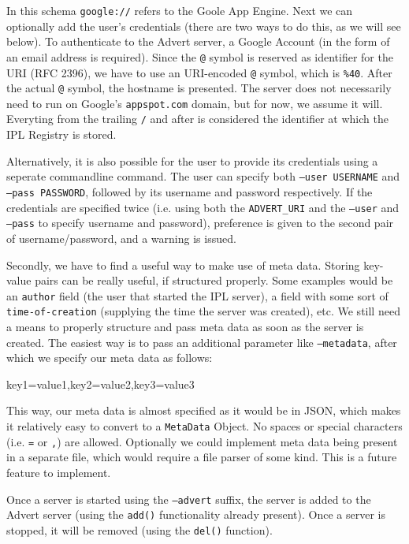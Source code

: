 In this schema \texttt{google://} refers to the Goole App Engine. Next we can
optionally add the user's credentials (there are two ways to do this, as we
will see below). To authenticate to the Advert server, a Google Account (in
the form of an email address is required). Since the \texttt{@} symbol is
reserved as identifier for the URI (RFC 2396), we have to use an URI-encoded
\texttt{@} symbol, which is \texttt{\%40}. After the actual \texttt{@}
symbol, the hostname is presented. The server does not necessarily need to run
on Google's \texttt{appspot.com} domain, but for now, we assume it will.
Everyting from the trailing \texttt{/} and after is considered the identifier at
which the IPL Registry is stored.

Alternatively, it is also possible for the user to provide its credentials
using a seperate commandline command. The user can specify both \texttt{--user
USERNAME} and \texttt{--pass PASSWORD}, followed by its username and password
respectively. If the credentials are specified twice (i.e. using both the
\texttt{ADVERT\_URI} and the \texttt{--user} and \texttt{--pass} to specify
username and password), preference is given to the second pair of
username/password, and a warning is issued.

Secondly, we have to find a useful way to make use of meta data. Storing
key-value pairs can be really useful, if structured properly. Some examples
would be an \texttt{author} field (the user that started the IPL server), a
field with some sort of \texttt{time-of-creation} (supplying the time the
server was created), etc. We still need a means to properly structure
and pass meta data as soon as the server is created. The easiest way is to pass
an additional parameter like \texttt{--metadata}, after which we specify our
meta data as follows:

\begin{center}
\begin{code}
key1=value1,key2=value2,key3=value3
\end{code}
\end{center}

This way, our meta data is almost specified as it would be in JSON, which makes
it relatively easy to convert to a \texttt{MetaData} Object. No spaces or
special characters (i.e. \texttt{=} or \texttt{,}) are allowed. Optionally we
could implement meta data being present in a separate file, which would require a
file parser of some kind. This is a future feature to implement.

Once a server is started using the \texttt{--advert} suffix, the server is added
to the Advert server (using the \texttt{add()} functionality already present).
Once a server is stopped, it will be removed (using the \texttt{del()}
function).


